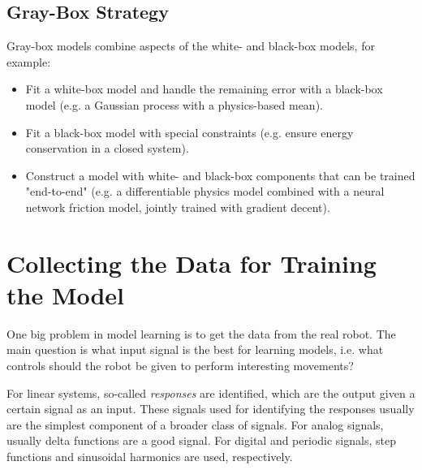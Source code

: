 		\subsection{Gray-Box Strategy}
			Gray-box models combine aspects of the white- and black-box models, for example:
			\begin{itemize}
				\item Fit a white-box model and handle the remaining error with a black-box model (e.g. a Gaussian process with a physics-based mean).
				\item Fit a black-box model with special constraints (e.g. ensure energy conservation in a closed system).
				\item Construct a model with white- and black-box components that can be trained "end-to-end" (e.g. a differentiable physics model combined with a neural network friction model, jointly trained with gradient decent).
			\end{itemize}

	\section{Collecting the Data for Training the Model}
		One big problem in model learning is to get the data from the real robot. The main question is what input signal is the best for learning models, i.e. what controls should the robot be given to perform interesting movements?

		For linear systems, so-called \emph{responses} are identified, which are the output given a certain signal as an input. These signals used for identifying the responses usually are the simplest component of a broader class of signals. For analog signals, usually delta functions are a good signal. For digital and periodic signals, step functions and sinusoidal harmonics are used, respectively.

